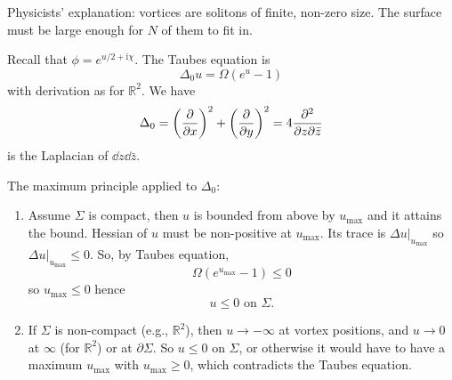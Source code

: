 \documentclass[a4paper,11pt]{article}
\begin{document}
    Physicists' explanation: vortices are solitons of finite, non-zero size. The surface must be large enough for $N$ of them to fit in.

    Recall that $\phi = e^{u/2 + \mathrm{i} \chi}$. The Taubes equation is 
    \begin{equation}
        \Delta_0 u = \Omega (e^u - 1)
    \end{equation}
    with derivation as for $\mathbb{R}^2$. We have 
    \begin{equation}
        \Delta_0 = \left( \pdv{x} \right)^2 + \left( \pdv{y} \right)^2 = 4 \pdv{}{z}{\bar z}
    \end{equation}
    is the Laplacian of $\dd{z} \dd{\bar z}$.

    The maximum principle applied to $\Delta_0$: 
    \begin{enumerate}[1)]
        \item Assume $\Sigma$ is compact, then $u$ is bounded from above by $u_\text{max}$ and it attains the bound. Hessian of $u$ must be non-positive at $u_\text{max}$. Its trace is $\Delta u|_{u_\text{max}}$ so $\Delta u|_{u_\text{max}} \leq 0$. So, by Taubes equation, \begin{equation}
            \Omega (e^{u_\text{max}} - 1) \leq 0
        \end{equation} 
        so $u_\text{max} \leq 0$ hence 
        \begin{equation}
            \boxed{u \leq 0 \text{ on }\Sigma}.
        \end{equation}
        \item If $\Sigma$ is non-compact (e.g., $\mathbb{R}^2$), then $u \to -\infty$ at vortex positions, and $u \to 0$ at $\infty$ (for $\mathbb{R}^2$) or at $\partial \Sigma$. So $u \leq 0$ on $\Sigma$, or otherwise it would have to have a maximum $u_\text{max}$ with $u_\text{max} \geq 0$, which contradicts the Taubes equation. 
    \end{enumerate}
\end{document}
